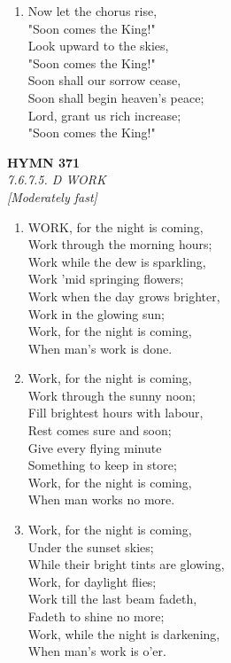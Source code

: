 \begin{enumerate}
    \item Now let the chorus rise, \\
        "Soon comes the King!" \\
        Look upward to the skies, \\
        "Soon comes the King!" \\
        Soon shall our sorrow cease, \\
        Soon shall begin heaven's peace; \\
        Lord, grant us rich increase; \\
        "Soon comes the King!"

\end{enumerate}

\newpage
\begin{center}
    {\Large \textbf{HYMN 371}}
    \\
    \textit{7.6.7.5. D WORK}
    \\
    \textit{\small [Moderately fast]}
\end{center}
\vspace{1em}

\begin{enumerate}
    \item WORK, for the night is coming, \\
        Work through the morning hours; \\
        Work while the dew is sparkling, \\
        Work 'mid springing flowers; \\
        Work when the day grows brighter, \\
        Work in the glowing sun; \\
        Work, for the night is coming, \\
        When man's work is done.

    \item Work, for the night is coming, \\
        Work through the sunny noon; \\
        Fill brightest hours with labour, \\
        Rest comes sure and soon; \\
        Give every flying minute \\
        Something to keep in store; \\
        Work, for the night is coming, \\
        When man works no more.

    \item Work, for the night is coming, \\
        Under the sunset skies; \\
        While their bright tints are glowing, \\
        Work, for daylight flies; \\
        Work till the last beam fadeth, \\
        Fadeth to shine no more; \\
        Work, while the night is darkening, \\
        When man's work is o'er.

\end{enumerate}

